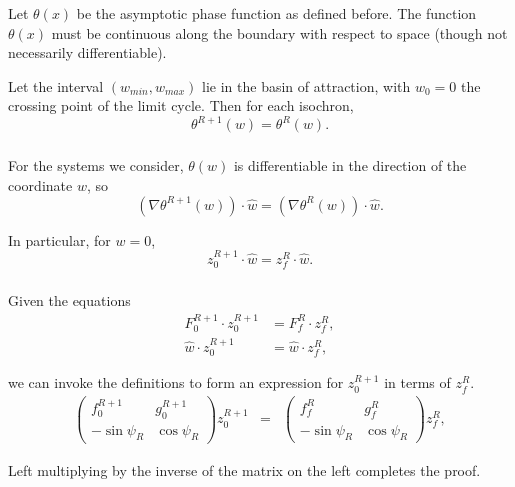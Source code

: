 \documentclass{beamer}
\renewcommand{\matrix}[2]{ \left(\begin{array}{#1} #2 \end{array}\right)}
\begin{document}
\begin{frame}
\frametitle{\insertsection}
\framesubtitle{\insertsubsection}
Let $\theta(x)$ be the asymptotic phase function as defined before.  The function $\theta(x)$ must be continuous along the boundary with respect to space (though not necessarily differentiable).

Let the interval $(w_{min},w_{max})$ lie in the basin of attraction, with $w_0=0$ the crossing point of the limit cycle.  Then for each isochron,
\begin{equation}
\theta^{R+1}(w) = \theta^R(w).
\end{equation}
\end{frame}

\begin{frame}
\frametitle{\insertsection}
\framesubtitle{\insertsubsection}
For the systems we consider, $\theta(w)$ is differentiable in the direction of the coordinate $w$, so
\begin{equation}
\left(\nabla\theta^{R+1}(w)\right)\cdot\hat{w}=\left(\nabla\theta^R(w)\right)\cdot\hat{w}.
\end{equation}

In particular, for $w = 0$,
\begin{equation}
 z_0^{R+1}\cdot\hat{w}=z_f^{R}\cdot\hat{w}.
\end{equation}
\end{frame}


\begin{frame}
\frametitle{\insertsection}
\framesubtitle{\insertsubsection}
Given the equations 
\begin{equation}
\begin{split}
 F_0^{R+1}\cdot z_0^{R+1}&=F_f^{R}\cdot z_f^{R},\\
 \hat{w}\cdot z_0^{R+1}&=\hat{w}\cdot z_f^{R},
\end{split}
\end{equation}

we can invoke the definitions to form an expression for $z_0^{R+1}$ in terms of $z_f^{R}$.
\begin{eqnarray}
\matrix{cc}{f_0^{R+1} & g_0^{R+1}\\ -\sin\psi_R & \cos\psi_R}z_0^{R+1}
&=&
\matrix{cc}{f_f^R & g_f^R\\ -\sin\psi_R & \cos\psi_R}z_f^R,
\end{eqnarray}

Left multiplying by the inverse of the matrix on the left completes the proof.
\end{frame}
\end{document}
